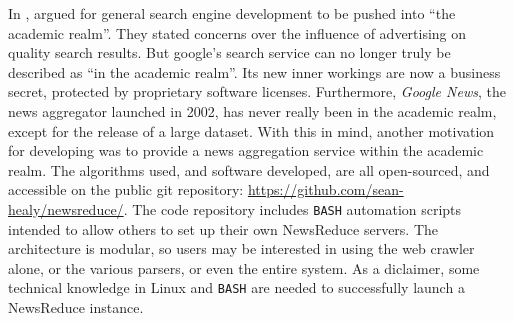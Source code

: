 In , \citeauthor{page1998} argued for general
search engine development to be pushed into ``the academic realm''.  They
stated concerns over the influence of advertising on quality search
results.  But google's search service can no longer truly be described as
``in the academic realm''.  Its new inner workings are now a business
secret, protected by proprietary software licenses. Furthermore,
{\it Google News}, the news
aggregator launched in 2002, has never really been in the academic
realm, except for the release of a large dataset.  With this in mind,
another motivation for developing \nr{} was to provide
a news aggregation service within the academic realm.  The algorithms
used, and software developed, are all open-sourced, and accessible
on the public git repository: \url{https://github.com/sean-healy/newsreduce/}.  The code
repository includes {\tt BASH} automation
scripts intended to allow others to set up their own NewsReduce
servers.  The architecture is modular, so users may be interested in
using the web crawler alone, or the various parsers, or even the entire
system. As a diclaimer, some technical knowledge in Linux and
{\tt BASH} are needed to successfully launch a NewsReduce instance.